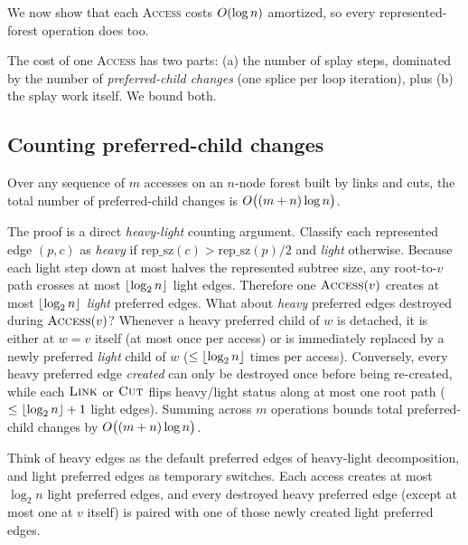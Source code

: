 We now show that each \textsc{Access} costs $O(\log n)$ amortized, so every
represented-forest operation does too.

The cost of one \textsc{Access} has two parts: (a) the number of splay steps,
dominated by the number of \emph{preferred-child changes} (one splice per loop
iteration), plus (b) the splay work itself. We bound both.

\subsection{Counting preferred-child changes}

\begin{lemma}
\label{ch22:lem-prefchanges}
Over any sequence of $m$ accesses on an $n$-node forest built by links and cuts,
the total number of preferred-child changes is $O\bigl((m+n)\log n\bigr)$.
\end{lemma}

The proof is a direct \emph{heavy-light} counting argument. Classify each
represented edge $(p,c)$ as \emph{heavy} if $\text{rep\_sz}(c) > \text{rep\_sz}(p)/2$
and \emph{light} otherwise. Because each light step down at most halves the
represented subtree size, any root-to-$v$ path crosses at most $\lfloor\log_2 n\rfloor$
light edges. Therefore one $\textsc{Access}(v)$ creates at most $\lfloor\log_2 n\rfloor$
\emph{light} preferred edges. What about \emph{heavy} preferred edges destroyed
during $\textsc{Access}(v)$? Whenever a heavy preferred child of $w$ is detached,
it is either at $w=v$ itself (at most once per access) or is immediately replaced
by a newly preferred \emph{light} child of $w$ ($\le \lfloor\log_2 n\rfloor$ times per
access). Conversely, every heavy preferred edge \emph{created} can only be
destroyed once before being re-created, while each $\textsc{Link}$ or $\textsc{Cut}$
flips heavy/light status along at most one root path ($\le \lfloor\log_2 n\rfloor+1$
light edges). Summing across $m$ operations bounds total preferred-child changes
by $O\bigl((m+n)\log n\bigr)$.

\begin{intuitionbox}
Think of heavy edges as the default preferred edges of heavy-light decomposition,
and light preferred edges as temporary switches. Each access creates at most
$\log_2 n$ light preferred edges, and every destroyed heavy preferred edge (except
at most one at $v$ itself) is paired with one of those newly created light
preferred edges.
\end{intuitionbox}

